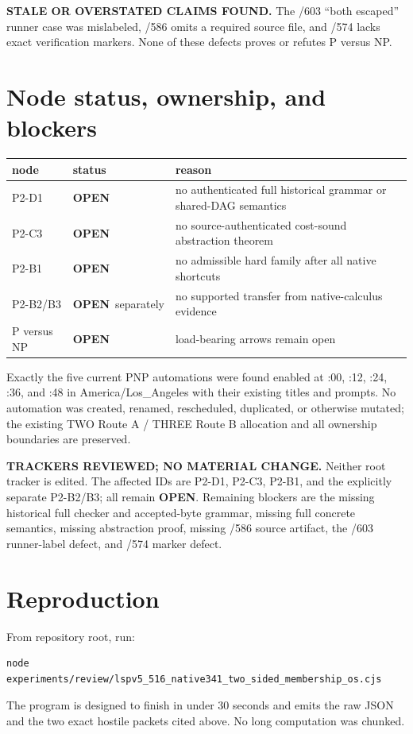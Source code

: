 \documentclass[11pt]{article}
\newcommand{\OPEN}{\textbf{OPEN}}
\begin{document}
\textbf{STALE OR OVERSTATED CLAIMS FOUND.} The /603 ``both escaped'' runner case
was mislabeled, /586 omits a required source file, and /574 lacks exact verification
markers.  None of these defects proves or refutes P versus NP.

\section{Node status, ownership, and blockers}

\begin{center}
\begin{tabular}{@{}lll@{}}
\toprule
node & status & reason\\
\midrule
P2-D1 & \OPEN & no authenticated full historical grammar or shared-DAG semantics\\
P2-C3 & \OPEN & no source-authenticated cost-sound abstraction theorem\\
P2-B1 & \OPEN & no admissible hard family after all native shortcuts\\
P2-B2/B3 & \OPEN\ separately & no supported transfer from native-calculus evidence\\
P versus NP & \OPEN & load-bearing arrows remain open\\
\bottomrule
\end{tabular}
\end{center}

Exactly the five current PNP automations were found enabled at :00, :12, :24,
:36, and :48 in America/Los\_Angeles with their existing titles and prompts.  No
automation was created, renamed, rescheduled, duplicated, or otherwise mutated;
the existing TWO Route A / THREE Route B allocation and all ownership boundaries
are preserved.

\textbf{TRACKERS REVIEWED; NO MATERIAL CHANGE.}  Neither root tracker is edited.
The affected IDs are P2-D1, P2-C3, P2-B1, and the explicitly separate P2-B2/B3;
all remain \OPEN.  Remaining blockers are the missing historical full checker and
accepted-byte grammar, missing full concrete semantics, missing abstraction proof,
missing /586 source artifact, the /603 runner-label defect, and /574 marker defect.

\section{Reproduction}

From repository root, run:
\begin{verbatim}
node experiments/review/lspv5_516_native341_two_sided_membership_os.cjs
\end{verbatim}
The program is designed to finish in under 30 seconds and emits the raw JSON and
the two exact hostile packets cited above.  No long computation was chunked.

\end{document}
